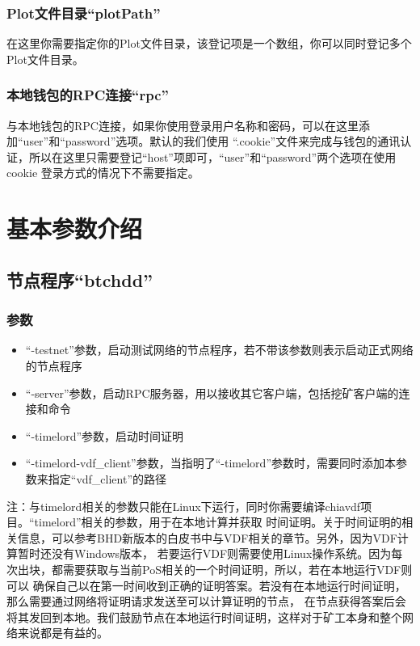 \begin{flushleft}
\subsubsection{Plot文件目录``plotPath''}
\begin{flushleft}
    在这里你需要指定你的Plot文件目录，该登记项是一个数组，你可以同时登记多个Plot文件目录。
\end{flushleft}
\subsubsection{本地钱包的RPC连接``rpc''}
\begin{flushleft}
    与本地钱包的RPC连接，如果你使用登录用户名称和密码，可以在这里添加``user''和``password''选项。默认的我们使用
    ``.cookie''文件来完成与钱包的通讯认证，所以在这里只需要登记``host''项即可，``user''和``password''两个选项在使用cookie
    登录方式的情况下不需要指定。
\end{flushleft}
\section{基本参数介绍}
\subsection{节点程序``btchdd''}
\subsubsection{参数}
\begin{itemize}
    \item ``-testnet''参数，启动测试网络的节点程序，若不带该参数则表示启动正式网络的节点程序
    \item ``-server''参数，启动RPC服务器，用以接收其它客户端，包括挖矿客户端的连接和命令
    \item ``-timelord''参数，启动时间证明
    \item ``-timelord-vdf\_client''参数，当指明了``-timelord''参数时，需要同时添加本参数来指定``vdf\_client''的路径
\end{itemize}
\begin{flushleft}
    注：与timelord相关的参数只能在Linux下运行，同时你需要编译chiavdf项目。``timelord''相关的参数，用于在本地计算并获取
    时间证明。关于时间证明的相关信息，可以参考BHD新版本的白皮书中与VDF相关的章节。另外，因为VDF计算暂时还没有Windows版本，
    若要运行VDF则需要使用Linux操作系统。因为每次出块，都需要获取与当前PoS相关的一个时间证明，所以，若在本地运行VDF则可以
    确保自己以在第一时间收到正确的证明答案。若没有在本地运行时间证明，那么需要通过网络将证明请求发送至可以计算证明的节点，
    在节点获得答案后会将其发回到本地。我们鼓励节点在本地运行时间证明，这样对于矿工本身和整个网络来说都是有益的。
\end{flushleft}

\end{flushleft}
